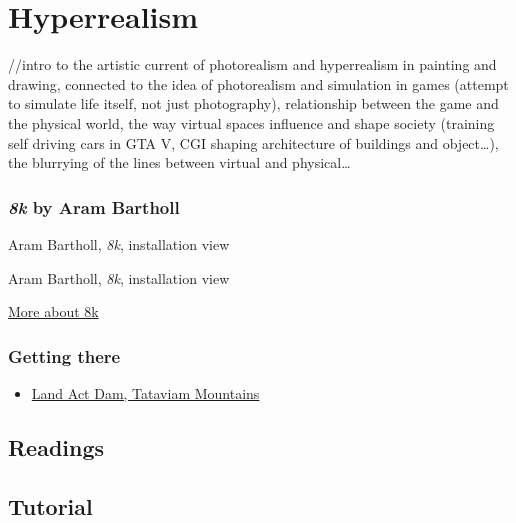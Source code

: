 \documentclass[
  openany]{book}
\providecommand{\tightlist}{%
  \setlength{\itemsep}{0pt}\setlength{\parskip}{0pt}}
\begin{document}
\hypertarget{hyperrealism}{%
\chapter{Hyperrealism}\label{hyperrealism}}

//intro to the artistic current of photorealism and hyperrealism in painting and drawing, connected to the idea of photorealism and simulation in games (attempt to simulate life itself, not just photography), relationship between the game and the physical world, the way virtual spaces influence and shape society (training self driving cars in GTA V, CGI shaping architecture of buildings and object\ldots), the blurrying of the lines between virtual and physical\ldots{}

\hypertarget{k-by-aram-bartholl}{%
\subsection*{\texorpdfstring{\emph{8k} by Aram Bartholl}{8k by Aram Bartholl}}\label{k-by-aram-bartholl}}

Aram Bartholl, \emph{8k}, installation view

Aram Bartholl, \emph{8k}, installation view

\href{https://arambartholl.com/8k/}{More about 8k}

\hypertarget{getting-there-8}{%
\subsection*{Getting there}\label{getting-there-8}}

\begin{itemize}
\tightlist
\item
  \href{https://grandtheftdata.com/landmarks/\#1672.279,-29.78,4,atlas,name=tataviam_act_dam,Land_Act_Dam,_Tataviam_Mountains}{Land Act Dam, Tataviam Mountains}
\end{itemize}

\hypertarget{readings-5}{%
\section*{Readings}\label{readings-5}}

\hypertarget{tutorial-5}{%
\section*{Tutorial}\label{tutorial-5}}
\end{document}
